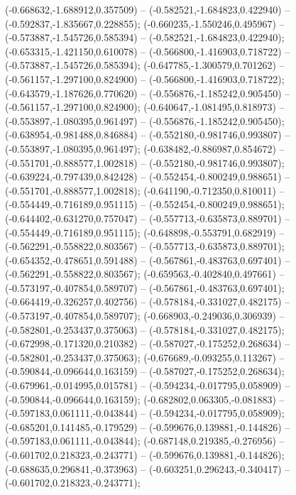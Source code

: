  (-0.668632,-1.688912,0.357509) -- (-0.582521,-1.684823,0.422940) -- (-0.592837,-1.835667,0.228855);
 (-0.660235,-1.550246,0.495967) -- (-0.573887,-1.545726,0.585394) -- (-0.582521,-1.684823,0.422940);
 (-0.653315,-1.421150,0.610078) -- (-0.566800,-1.416903,0.718722) -- (-0.573887,-1.545726,0.585394);
 (-0.647785,-1.300579,0.701262) -- (-0.561157,-1.297100,0.824900) -- (-0.566800,-1.416903,0.718722);
 (-0.643579,-1.187626,0.770620) -- (-0.556876,-1.185242,0.905450) -- (-0.561157,-1.297100,0.824900);
 (-0.640647,-1.081495,0.818973) -- (-0.553897,-1.080395,0.961497) -- (-0.556876,-1.185242,0.905450);
 (-0.638954,-0.981488,0.846884) -- (-0.552180,-0.981746,0.993807) -- (-0.553897,-1.080395,0.961497);
 (-0.638482,-0.886987,0.854672) -- (-0.551701,-0.888577,1.002818) -- (-0.552180,-0.981746,0.993807);
 (-0.639224,-0.797439,0.842428) -- (-0.552454,-0.800249,0.988651) -- (-0.551701,-0.888577,1.002818);
 (-0.641190,-0.712350,0.810011) -- (-0.554449,-0.716189,0.951115) -- (-0.552454,-0.800249,0.988651);
 (-0.644402,-0.631270,0.757047) -- (-0.557713,-0.635873,0.889701) -- (-0.554449,-0.716189,0.951115);
 (-0.648898,-0.553791,0.682919) -- (-0.562291,-0.558822,0.803567) -- (-0.557713,-0.635873,0.889701);
 (-0.654352,-0.478651,0.591488) -- (-0.567861,-0.483763,0.697401) -- (-0.562291,-0.558822,0.803567);
 (-0.659563,-0.402840,0.497661) -- (-0.573197,-0.407854,0.589707) -- (-0.567861,-0.483763,0.697401);
 (-0.664419,-0.326257,0.402756) -- (-0.578184,-0.331027,0.482175) -- (-0.573197,-0.407854,0.589707);
 (-0.668903,-0.249036,0.306939) -- (-0.582801,-0.253437,0.375063) -- (-0.578184,-0.331027,0.482175);
 (-0.672998,-0.171320,0.210382) -- (-0.587027,-0.175252,0.268634) -- (-0.582801,-0.253437,0.375063);
 (-0.676689,-0.093255,0.113267) -- (-0.590844,-0.096644,0.163159) -- (-0.587027,-0.175252,0.268634);
 (-0.679961,-0.014995,0.015781) -- (-0.594234,-0.017795,0.058909) -- (-0.590844,-0.096644,0.163159);
 (-0.682802,0.063305,-0.081883) -- (-0.597183,0.061111,-0.043844) -- (-0.594234,-0.017795,0.058909);
 (-0.685201,0.141485,-0.179529) -- (-0.599676,0.139881,-0.144826) -- (-0.597183,0.061111,-0.043844);
 (-0.687148,0.219385,-0.276956) -- (-0.601702,0.218323,-0.243771) -- (-0.599676,0.139881,-0.144826);
 (-0.688635,0.296841,-0.373963) -- (-0.603251,0.296243,-0.340417) -- (-0.601702,0.218323,-0.243771);
